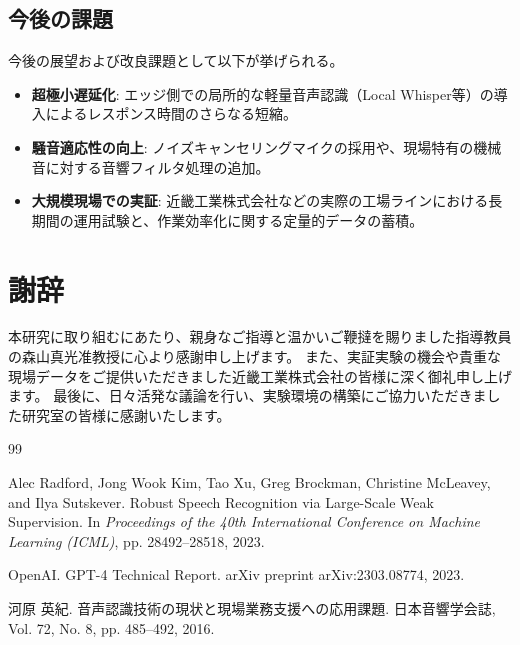 \documentclass[a4paper,12pt,ja=standard,lualatex]{bxjsarticle}
\begin{document}
\subsection{今後の課題}
今後の展望および改良課題として以下が挙げられる。
\begin{itemize}
    \item \textbf{超極小遅延化}: エッジ側での局所的な軽量音声認識（Local Whisper等）の導入によるレスポンス時間のさらなる短縮。
    \item \textbf{騒音適応性の向上}: ノイズキャンセリングマイクの採用や、現場特有の機械音に対する音響フィルタ処理の追加。
    \item \textbf{大規模現場での実証}: 近畿工業株式会社などの実際の工場ラインにおける長期間の運用試験と、作業効率化に関する定量的データの蓄積。
\end{itemize}

\newpage

\section*{謝辞}
本研究に取り組むにあたり、親身なご指導と温かいご鞭撻を賜りました指導教員の森山真光准教授に心より感謝申し上げます。
また、実証実験の機会や貴重な現場データをご提供いただきました近畿工業株式会社の皆様に深く御礼申し上げます。
最後に、日々活発な議論を行い、実験環境の構築にご協力いただきました研究室の皆様に感謝いたします。

\newpage

\begin{thebibliography}{99}
Alec Radford, Jong Wook Kim, Tao Xu, Greg Brockman, Christine McLeavey, and Ilya Sutskever.
Robust Speech Recognition via Large-Scale Weak Supervision.
In {\it Proceedings of the 40th International Conference on Machine Learning (ICML)}, pp. 28492--28518, 2023.

OpenAI.
GPT-4 Technical Report.
arXiv preprint arXiv:2303.08774, 2023.

河原 英紀.
音声認識技術の現状と現場業務支援への応用課題.
日本音響学会誌, Vol. 72, No. 8, pp. 485--492, 2016.
\end{thebibliography}

\newpage
\appendix
\end{document}

